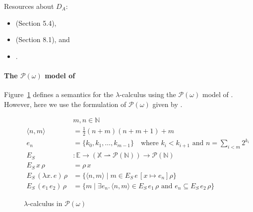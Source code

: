 \documentclass{tufte-handout}
\newcommand{\LAM}[1]{\lambda #1.\,}
\newcommand{\pto}[0]{\rightharpoonup}
\newcommand{\NAT}[0]{\mathbb{N}}
\newcommand{\VAR}[0]{\mathbb{X}}
\begin{document}
\noindent Resources about $D_A$:
\begin{itemize}
\item \citet{barendregt84:_lambda_calculus} (Section 5.4),
\item \citet{Gunter:1992aa} (Section 8.1), and
\item \citet{Engeler:1981aa}.
\end{itemize}


\paragraph{The $\mathcal{P}(\omega)$ model of \citet{Scott:1976lq}}
\label{sec:p-omega}



Figure~\ref{fig:p-omega} defines a semantics for the
$\lambda$-calculus using the $\mathcal{P}(\omega)$ model of
\citet{Scott:1976lq}.  However, here we use the formulation of
$\mathcal{P}(\omega)$ given by \citet{barendregt84:_lambda_calculus}.

\newcommand{\EPo}[0]{E_S}
\newcommand{\POSEM}[1]{\EPo{}\,#1\,}


\begin{figure}
\begin{align*}
     & m,n \in \NAT \\
\langle n,m \rangle &= \frac{1}{2}(n + m)(n+m+1) + m \\
e_n &= \{ k_0, k_1, \ldots, k_{m-1} \} \quad \text{where }
    k_i < k_{i+1} \text{ and } n = \sum_{i<m} 2^{k_i}\\[2ex]
\EPo{} & : \mathbb{E} \to (\VAR \pto \mathcal{P}(\NAT)) \to \mathcal{P}(\NAT) \\
\POSEM{x}\rho &= \rho\,x \\  
\POSEM{(\LAM{x}e)}\rho &= \{ \langle n, m \rangle \mid m \in \POSEM{e}[x\mapsto e_n]\rho \} \\
\POSEM{(e_1\,e_2)}\rho &= \{ m \mid \exists e_n. \, 
   \langle n,m \rangle \in \POSEM{e_1}\rho
   \text{ and } e_n \subseteq \POSEM{e_2}\rho \}
\end{align*}
\caption{$\lambda$-calculus in $\mathcal{P}(\omega)$}
\label{fig:p-omega}
\end{figure}
\end{document}
